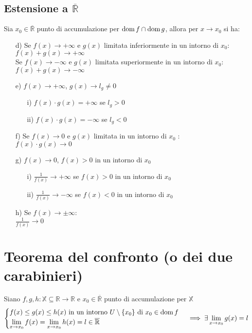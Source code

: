 \subsection{Estensione a $\overline{\mathbb{R}}$ }
Sia $x_0 \in \overline{\mathbb{R}}$ punto di accumulazione per $\operatorname{dom} f \cap \operatorname{dom} g$, allora per $x \to x_0$ si ha:
\begin{enumerate}
\item[d)]Se $f(x) \to +\infty$ e $g(x)$ limitata inferiormente in un intorno di $x_0$:\\
$f(x)+g(x) \longrightarrow +\infty$ \\
Se $f(x) \to -\infty$ e $g(x)$ limitata superiormente in un intorno di $x_0$:\\
$f(x)+g(x) \longrightarrow -\infty$
\item[e)]$f(x) \to +\infty$, $g(x) \to l_g \not=0$
\begin{itemize}
\item[i)]$f(x) \cdot g(x) = +\infty$ se $l_g>0$
\item[ii)]$f(x) \cdot g(x) = -\infty$ se $l_g<0$
\end{itemize}
\item[f)]Se $f(x) \to 0$ e $g(x)$ limitata in un intorno di $x_0$ :\\
$f(x)\cdot g(x) \longrightarrow 0$
\item[g)]$f(x) \to 0$, $f(x)>0$ in un intorno di $x_0$
\begin{itemize}
\item[i)]$\frac{1}{f(x)} \to +\infty$ se $f(x)>0$ in un intorno di $x_0$
\item[ii)]$\frac{1}{f(x)} \to -\infty$ se $f(x)<0$ in un intorno di $x_0$
\end{itemize}
\item[h)]Se $f(x) \to \pm \infty$: \\
$\frac{1}{f(x)} \longrightarrow 0$
\end{enumerate}
\section{Teorema del confronto (o dei due carabinieri)}
Siano $f,g,h: \mathbb{X} \subseteq \mathbb{R} \to \mathbb{R}$ e $x_0 \in \mathbb{\overline{R}}$ punto di accumulazione per $\mathbb{X}$\\
\begin{equation}
\begin{cases}
f(x) \leq g(x) \leq h(x) \text{ in un intorno } U \setminus \{x_0\} \text{ di } x_0 \in \operatorname{dom} f\\
\displaystyle \lim_{x \to x_0}f(x) = \lim_{x \to x_0}h(x) = l \in \mathbb{\overline{R}}
\end{cases}
\implies \exists \displaystyle \lim_{x \to x_0}g(x) = l
\end{equation}
